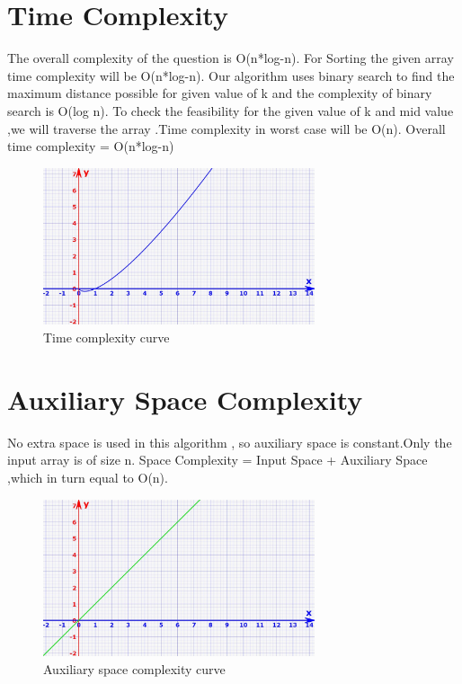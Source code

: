 \documentclass[conference]{IEEEtran}
\begin{document}
\section{\textbf {Time Complexity}}
\noindent The overall complexity of the question is O(n*log-n).
For Sorting the given array time complexity will be O(n*log-n).
Our algorithm uses binary search to find the maximum distance possible for given value of k and the complexity of binary search is O(log n).
To check the feasibility for the given value of k and mid value ,we will traverse the array .Time complexity in worst case will be O(n).
Overall time complexity = O(n*log-n)  


\begin{figure}[htp]
    \centering
    \includegraphics[width=8cm]{TimeComplexity}
    \caption{Time complexity curve}
    \label{fig:timecomplexity.png}
\end{figure}

\section{\textbf {Auxiliary Space Complexity}}
\noindent No extra space is used in this algorithm , so auxiliary space is constant.Only the input array is of size n.
Space Complexity = Input Space + Auxiliary Space ,which in turn equal to O(n).


\begin{figure}[htp]
    \centering
    \includegraphics[width=8cm]{AuxiliarySpaceComplexity}
    \caption{Auxiliary space complexity curve}
    \label{fig:Aux.png}
\end{figure}
\end{document}
